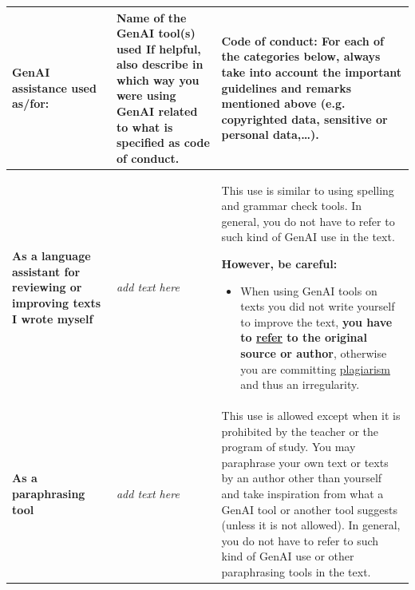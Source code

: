 \begin{longtable}{|p{}|p{}|p{}|}
\hline 
\textbf{GenAI assistance used as/for:} & \textbf{Name of the GenAI tool(s) used} If helpful, also describe in which way you were using GenAI related to what is specified as code of conduct. & \textbf{Code of conduct: \newline
For each of the categories below, always take into account the important guidelines and remarks mentioned above (e.g. copyrighted data, sensitive or personal data,…).} \\ \hline
\endfirsthead


\hline
\endfoot

\hline
\endlastfoot

\textbf{As a language assistant for reviewing or improving texts I wrote myself} & \textit{add text here} & This use is similar to using spelling and grammar check tools. In general, you do not have to refer to such kind of GenAI use in the text. 

\textbf{However, be careful: }
\begin{itemize}
    \item When using GenAI tools on texts you did not write yourself to improve the text, \textbf{you have to \href{https://bib.kuleuven.be/english/training-and-tutorials/citation}{refer} to the original source or author}, otherwise you are committing \href{https://www.kuleuven.be/english/education/plagiarism/index}{plagiarism} and thus an irregularity.
\end{itemize} \\ \hline
\textbf{As a paraphrasing tool} & \textit{add text here} & This use is allowed except when it is prohibited by the teacher or the program of study. You may paraphrase your own text or texts by an author other than yourself and take inspiration from what a GenAI tool or another tool suggests (unless it is not allowed). In general, you do not have to refer to such kind of GenAI use or other paraphrasing tools in the text. 


\end{longtable}
